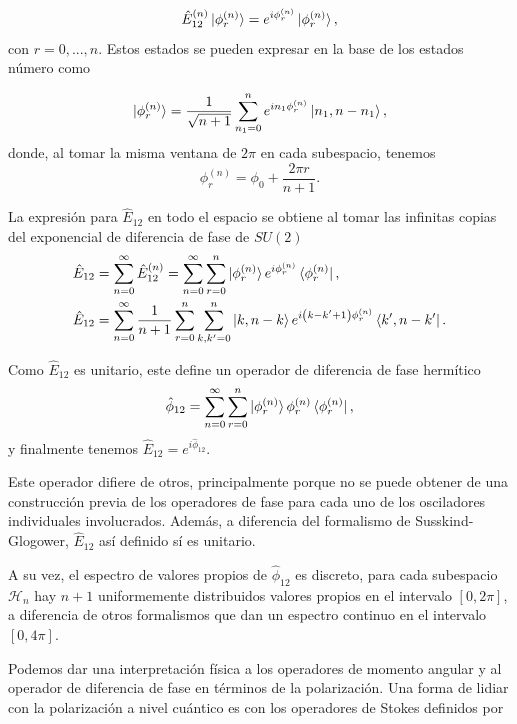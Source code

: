     \begin{equation}
        \hat{E}_{12}^{(n)}\ket{\phi_r^{(n)}} = e^{i\phi_r^{(n)}}\ket{\phi_r^{(n)}},
    \end{equation}
    con $r=0,...,n.$ Estos estados se pueden expresar en la base de los estados número como

    \begin{equation}
        \ket{\phi_r^{(n)}} = \frac{1}{\sqrt{n+1}} \sum_{n_1=0}^n e^{in_1\phi_r^{(n)}}\ket{n_1,n-n_1},
    \end{equation}
    donde, al tomar la misma ventana de $2\pi$ en cada subespacio, tenemos
    \begin{equation}
        \phi_r^{(n)} = \phi_0 + \frac{2\pi r}{n+1}.
    \end{equation}

    La expresión para $\hat{E}_{12}$ en todo el espacio se obtiene al tomar las infinitas copias del exponencial de diferencia de fase de $SU(2)$
    \begin{align}
        & \hat{E}_{12} = \sum_{n=0}^\infty \hat{E}_{12}^{(n)} = \sum_{n=0}^\infty \sum_{r=0}^n \ket{\phi_r^{(n)}}e^{i\phi_r^{(n)}}\bra{\phi_r^{(n)}},\\
        & \hat{E}_{12} = \sum_{n=0}^\infty \frac{1}{n+1}\sum_{r=0}^n \sum_{k,k'=0}^n \ket{k,n-k}e^{i\left( k-k'+1 \right)\phi_r^{(n)}}\bra{k',n-k'}.
    \end{align}

    Como $\hat{E}_{12}$ es unitario, este define un operador de diferencia de fase hermítico
    \begin{equation}
        \hat{\phi}_{12} = \sum_{n=0}^\infty \sum_{r=0}^n \ket{\phi_r^{(n)}}\phi_r^{(n)}\bra{\phi_r^{(n)}},
    \end{equation}
    y finalmente tenemos $\hat{E}_{12} = e^{i\hat{\phi}_{12}}$.

    Este operador difiere de otros, principalmente porque no se puede obtener de una construcción previa de los operadores de fase para cada uno de los osciladores individuales involucrados. Además, a diferencia del formalismo de Susskind-Glogower, $\hat{E}_{12}$ así definido sí es unitario.

    A su vez, el espectro de valores propios de $\hat{\phi}_{12}$ es discreto, para cada subespacio $\mathcal{H}_n$ hay $n+1$ uniformemente distribuidos valores propios en el intervalo $[0,2\pi]$, a diferencia de otros formalismos que dan un espectro continuo en el intervalo $[0,4\pi]$.

    Podemos dar una interpretación física a los operadores de momento angular y al operador de diferencia de fase en términos de la polarización. Una forma de lidiar con la polarización a nivel cuántico es con los operadores de Stokes definidos por

